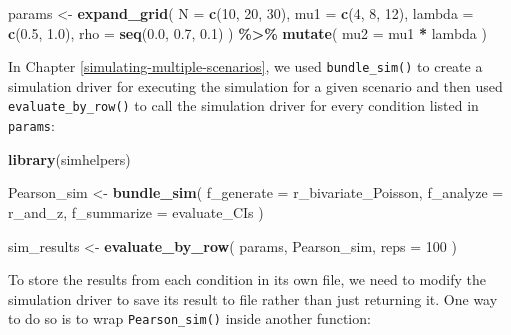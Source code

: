 \documentclass[
]{book}
\newenvironment{Shaded}{\begin{snugshade}}{\end{snugshade}}
\newcommand{\AttributeTok}[1]{\textcolor[rgb]{0.13,0.29,0.53}{#1}}
\newcommand{\ConstantTok}[1]{\textcolor[rgb]{0.56,0.35,0.01}{#1}}
\newcommand{\ControlFlowTok}[1]{\textcolor[rgb]{0.13,0.29,0.53}{\textbf{#1}}}
\newcommand{\DecValTok}[1]{\textcolor[rgb]{0.00,0.00,0.81}{#1}}
\newcommand{\FloatTok}[1]{\textcolor[rgb]{0.00,0.00,0.81}{#1}}
\newcommand{\FunctionTok}[1]{\textcolor[rgb]{0.13,0.29,0.53}{\textbf{#1}}}
\newcommand{\NormalTok}[1]{#1}
\newcommand{\OtherTok}[1]{\textcolor[rgb]{0.56,0.35,0.01}{#1}}
\newcommand{\SpecialCharTok}[1]{\textcolor[rgb]{0.81,0.36,0.00}{\textbf{#1}}}
\begin{document}
\begin{Shaded}
\begin{Highlighting}[]
\NormalTok{params }\OtherTok{\textless{}{-}} \FunctionTok{expand\_grid}\NormalTok{( }
  \AttributeTok{N =} \FunctionTok{c}\NormalTok{(}\DecValTok{10}\NormalTok{, }\DecValTok{20}\NormalTok{, }\DecValTok{30}\NormalTok{),}
  \AttributeTok{mu1 =} \FunctionTok{c}\NormalTok{(}\DecValTok{4}\NormalTok{, }\DecValTok{8}\NormalTok{, }\DecValTok{12}\NormalTok{),}
  \AttributeTok{lambda =} \FunctionTok{c}\NormalTok{(}\FloatTok{0.5}\NormalTok{, }\FloatTok{1.0}\NormalTok{),}
  \AttributeTok{rho =} \FunctionTok{seq}\NormalTok{(}\FloatTok{0.0}\NormalTok{, }\FloatTok{0.7}\NormalTok{, }\FloatTok{0.1}\NormalTok{) }
\NormalTok{) }\SpecialCharTok{\%\textgreater{}\%}
  \FunctionTok{mutate}\NormalTok{( }\AttributeTok{mu2 =}\NormalTok{ mu1 }\SpecialCharTok{*}\NormalTok{ lambda )}
\end{Highlighting}
\end{Shaded}

In Chapter \ref{simulating-multiple-scenarios}, we used \texttt{bundle\_sim()} to create a simulation driver for executing the simulation for a given scenario and then used \texttt{evaluate\_by\_row()} to call the simulation driver for every condition listed in \texttt{params}:

\begin{Shaded}
\begin{Highlighting}[]
\FunctionTok{library}\NormalTok{(simhelpers)}

\NormalTok{Pearson\_sim }\OtherTok{\textless{}{-}} \FunctionTok{bundle\_sim}\NormalTok{( }\AttributeTok{f\_generate =}\NormalTok{ r\_bivariate\_Poisson, }\AttributeTok{f\_analyze =}\NormalTok{ r\_and\_z, }\AttributeTok{f\_summarize =}\NormalTok{ evaluate\_CIs )}

\NormalTok{sim\_results }\OtherTok{\textless{}{-}} \FunctionTok{evaluate\_by\_row}\NormalTok{( params, Pearson\_sim, }\AttributeTok{reps =} \DecValTok{100}\NormalTok{ )}
\end{Highlighting}
\end{Shaded}

To store the results from each condition in its own file, we need to modify the simulation driver to save its result to file rather than just returning it.
One way to do so is to wrap \texttt{Pearson\_sim()} inside another function:

\begin{Shaded}
\end{Shaded}
\end{document}
